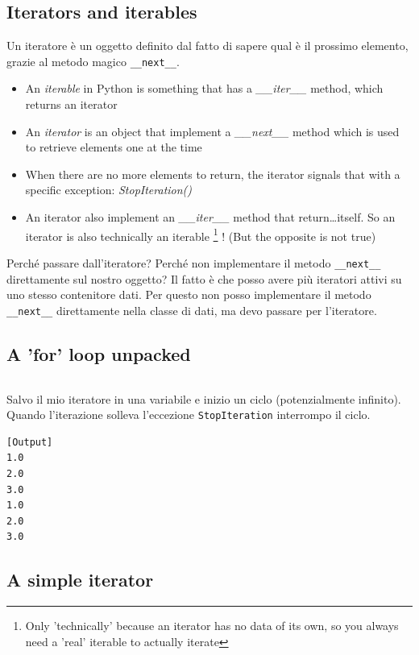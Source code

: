   \subsection{Iterators and iterables}
Un iteratore è un oggetto definito dal fatto di sapere qual è il prossimo elemento, grazie al metodo magico \texttt{\_\_next\_\_}.  

  \begin{itemize}
    \item An \emph{iterable} in Python is something that has a \emph{\_\_iter\_\_}
          method, which returns an \alert{iterator}
    \item An \emph{iterator} is an object that implement a \emph{\_\_next\_\_} method
          which is used to retrieve elements one at the time
    \item When there are no more elements to return, the iterator signals that with a specific
          exception: \emph{StopIteration()}
    \item An iterator also implement an \emph{\_\_iter\_\_} method that return\dots itself.
          So an iterator is also technically an iterable%
          \footnote{Only 'technically' because an iterator has no data of its
          own, so you always need a 'real' iterable to actually iterate}%
          ! (But the opposite is not true)
  \end{itemize}

Perché passare dall'iteratore? Perché non implementare il metodo \texttt{\_\_next\_\_} direttamente sul nostro oggetto? Il fatto è che posso avere più iteratori attivi su uno stesso contenitore dati. Per questo non posso implementare il metodo \texttt{\_\_next\_\_} direttamente nella classe di dati, ma devo passare per l'iteratore.

\subsection{A 'for' loop unpacked}

\inputminted{python}{snippets/show_iterator.py}
Salvo il mio iteratore in una variabile e inizio un ciclo (potenzialmente infinito). Quando l'iterazione solleva l'eccezione \texttt{StopIteration} interrompo il ciclo.
\begin{verbatim}
[Output]
1.0
2.0
3.0
1.0
2.0
3.0
\end{verbatim}

\subsection{A simple iterator}


